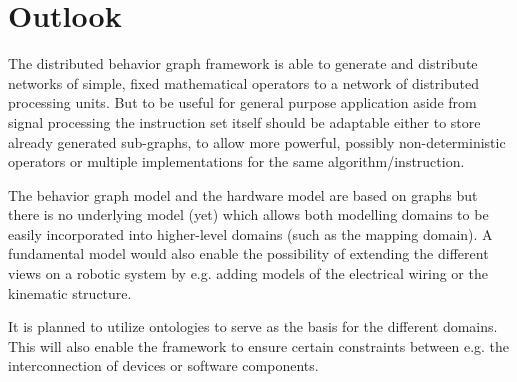 \documentclass[a4paper,twocolumn]{esapub2005} %
\begin{document}
\section{Outlook}
The distributed behavior graph framework is able to generate and distribute networks of simple, fixed mathematical operators to a network of distributed processing units.
But to be useful for general purpose application aside from signal processing the instruction set itself should be adaptable either to store already generated sub-graphs, to allow more powerful, possibly non-deterministic operators or multiple implementations for the same algorithm/instruction.

The behavior graph model and the hardware model are based on graphs but there is no underlying model (yet) which allows both modelling domains to be easily incorporated into higher-level domains (such as the mapping domain).
A fundamental model would also enable the possibility of extending the different views on a robotic system by e.g. adding models of the electrical wiring or the kinematic structure.

It is planned to utilize ontologies to serve as the basis for the different domains.
This will also enable the framework to ensure certain constraints between e.g. the interconnection of devices or software components.



\end{document}
